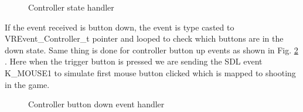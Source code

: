\documentclass[journal]{IEEEtran}
\begin{document}
\begin{figure}[h]
	\noindent
	\centering
	\caption{Controller state handler \label{fig:contr1}}
\end{figure}

If the event received is button down, the event is type casted to VREvent\_Controller\_t pointer and looped to check which buttons are in the down state. Same thing is done for controller button up events as shown in Fig. \ref{fig:contr2} . Here when the trigger button is pressed we are sending the SDL event K\_MOUSE1 to simulate first mouse button clicked which is mapped to shooting in the game.

\begin{figure}[H]
	\noindent
	\centering
	\caption{Controller button down event handler \label{fig:contr2}}
\end{figure}
\end{document}
